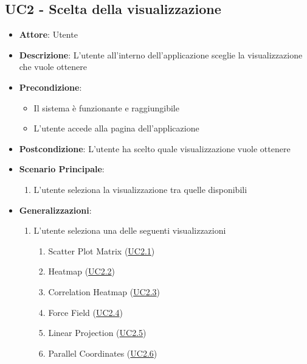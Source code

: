 \subsection{UC2 - Scelta della visualizzazione }
\label{uc2}

    \begin{itemize}
    \item \textbf{Attore}: Utente
    \item \textbf{Descrizione}: L'utente all'interno dell'applicazione sceglie la visualizzazione che vuole ottenere
    \item \textbf{Precondizione}:
    \begin{itemize}
        \item Il sistema è funzionante e raggiungibile
        \item L'utente accede alla pagina dell'applicazione
    \end{itemize}
    \item \textbf{Postcondizione}: L'utente ha scelto quale visualizzazione vuole ottenere
    \item \textbf{Scenario Principale}: 
        \begin{enumerate}
            \item L'utente seleziona la visualizzazione tra quelle disponibili
        \end{enumerate}  
    \item \textbf{Generalizzazioni}:
        \begin{enumerate}
            \item L'utente seleziona una delle seguenti visualizzazioni
                \begin{enumerate}
                    \item Scatter Plot Matrix (\hyperref[uc2.1]{UC2.1})
                    \item Heatmap (\hyperref[uc2.2]{UC2.2})
                    \item Correlation Heatmap (\hyperref[uc2.3]{UC2.3})
                    \item Force Field (\hyperref[uc2.4]{UC2.4})
                    \item Linear Projection (\hyperref[uc2.5]{UC2.5})
                    \item Parallel Coordinates (\hyperref[uc2.6]{UC2.6})
                \end{enumerate}
        \end{enumerate}  
    \end{itemize}
    
